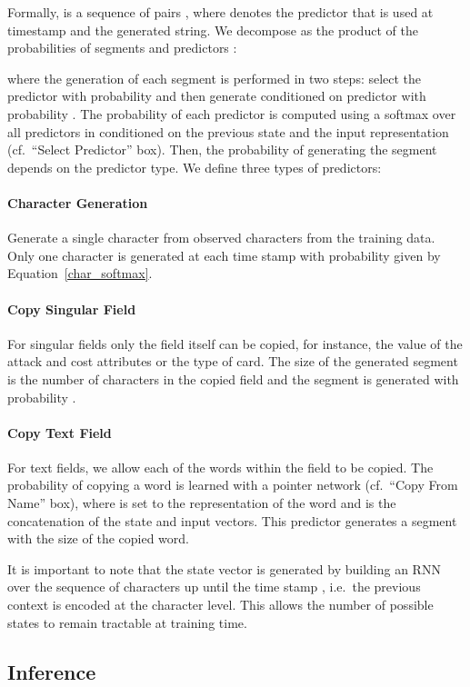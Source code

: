 \documentclass[11pt]{article}
\begin{document}
Formally,  is a sequence of pairs , where  denotes
the predictor that is used at time\-stamp  and  the
generated string. We decompose  as the product of the probabilities of segments  and
predictors :

where the generation of each segment is performed in two steps: select the
predictor  with probability  and then generate
 conditioned on predictor  with probability . The probability of each predictor is computed using a softmax over all
predictors in  conditioned on the previous state  and the
input representation  (cf.~``Select Predictor'' box). Then, the
probability of generating the segment  depends on the predictor type.
We define three types of predictors:

\paragraph{Character Generation} Generate a single character from observed
characters from the training data. Only one character is generated at each
time stamp with probability given by Equation~\ref{char_softmax}.

\paragraph{Copy Singular Field} For singular fields only the
field itself can be copied, for instance, the value of the attack and cost attributes
or the type of card. The size of the generated segment is the
number of characters in the copied field and
the segment is generated with probability .

\paragraph{Copy Text Field} For text fields, we allow each of the words
 within the field to be copied. The probability of copying a word is learned with
a pointer network (cf.~``Copy From Name'' box), where  is set to
the representation of the word  and
 is the concatenation  of the state and input vectors.
This predictor generates a segment with the size of the copied word.

It is important to note that the state vector  is
generated by building an RNN over the sequence of characters up until the
time stamp , i.e.\ the previous context  is
encoded at the character level. This allows the number of possible states to remain
tractable at training time.

\subsection{Inference}
\end{document}
